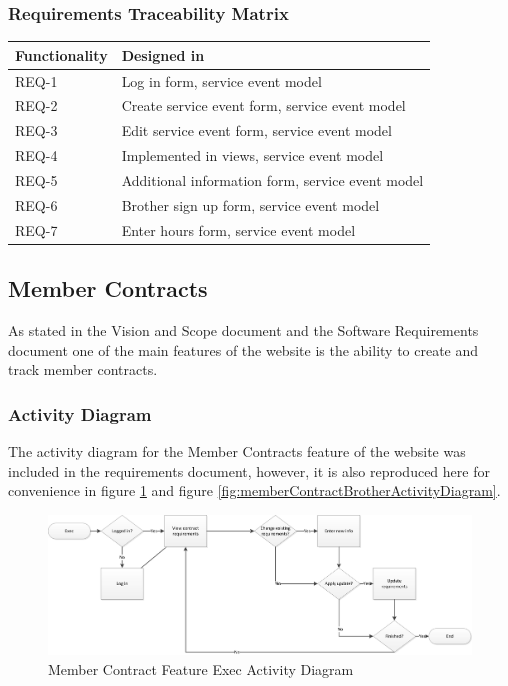 \documentclass{article}
\begin{document}
\subsubsection{Requirements Traceability Matrix}

\begin{table}
    \begin{tabular}{|l|l|}
        \hline
        Functionality & Designed in                                      \\ \hline
        REQ-1         & Log in form, service event model                 \\ 
        REQ-2         & Create service event form, service event model   \\ 
        REQ-3         & Edit service event form, service event model     \\ 
        REQ-4         & Implemented in views, service event model        \\ 
        REQ-5         & Additional information form, service event model \\ 
        REQ-6         & Brother sign up form, service event model        \\ 
        REQ-7         & Enter hours form, service event model            \\
        \hline
    \end{tabular}
\end{table}

\subsection{Member Contracts}

As stated in the Vision and Scope document and the Software Requirements document one of the main features of the website is the ability to create and track member contracts.

\subsubsection{Activity Diagram}
The activity diagram for the Member Contracts feature of the website was included in the requirements document, however, it is also reproduced here for convenience in figure \ref{fig:memberContractExecActivityDiagram} and figure \ref{fig:memberContractBrotherActivityDiagram}.

\FloatBarrier
\begin{figure}
\centering
\includegraphics[scale=.65]{img/activityDiagrams/memberContractActivity1}
\caption{Member Contract Feature Exec Activity Diagram}
\label{fig:memberContractExecActivityDiagram}
\end{figure}
\FloatBarrier
\end{document}
